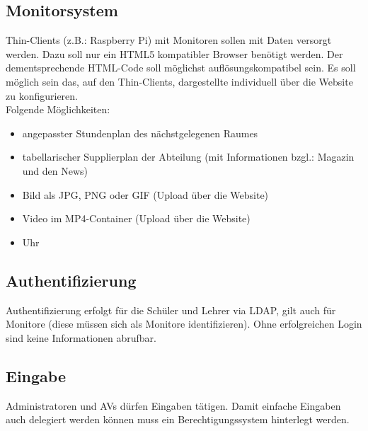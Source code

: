 \subsection{Monitorsystem}
Thin-Clients (z.B.: Raspberry Pi) mit Monitoren sollen mit Daten versorgt werden. Dazu soll nur ein HTML5 kompatibler Browser benötigt werden. Der dementsprechende HTML-­Code soll möglichst auflösungskompatibel sein.
Es soll möglich sein das, auf den Thin-Clients, dargestellte individuell über die Website zu konfigurieren.\\

Folgende Möglichkeiten:
\begin{itemize}
	\item 
		angepasster Stundenplan des nächstgelegenen Raumes
	\item
		tabellarischer Supplierplan der Abteilung (mit Informationen bzgl.: Magazin und den News)
	\item
		Bild als JPG, PNG oder GIF (Upload über die Website)
	\item
		Video im MP4-Container (Upload über die Website)
	\item
		Uhr
\end{itemize}

\subsection{Authentifizierung}
Authentifizierung erfolgt für die Schüler und Lehrer via LDAP, gilt auch für Monitore (diese müssen sich als Monitore identifizieren). Ohne erfolgreichen Login sind keine Informationen abrufbar.

\subsection{Eingabe}
Administratoren und AVs dürfen Eingaben tätigen. Damit einfache Eingaben auch delegiert werden können muss ein Berechtigungssystem hinterlegt werden.

